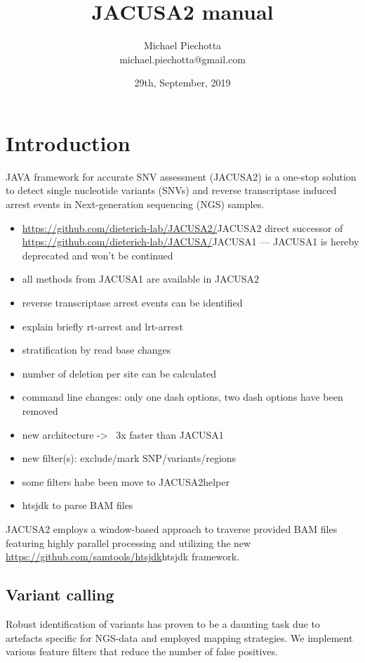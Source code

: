 \documentclass[10pt,a4paper,draft]{article}
\title{JACUSA2 manual}
\author{Michael Piechotta \\ michael.piechotta@gmail.com}
\date{29th, September, 2019}
\begin{document}
\maketitle 
\tableofcontents
\listoftodos
\section{Introduction}
JAVA framework for accurate SNV assessment (JACUSA2) is a one-stop solution to detect single
nucleotide variants (SNVs) and reverse transcriptase induced arrest events in Next-generation 
sequencing (NGS) samples. 
\begin{itemize}
  \item \url{https://github.com/dieterich-lab/JACUSA2/}{JACUSA2} direct successor of 
  \url{https://github.com/dieterich-lab/JACUSA/}{JACUSA1} --- JACUSA1 is hereby deprecated and won't be continued
  \item all methods from JACUSA1 are available in JACUSA2
  \item reverse transcriptase arrest events can be identified
  \item explain briefly rt-arrest and lrt-arrest
  \item stratification by read base changes
  \item number of deletion per site can be calculated 
  \item command line changes: only one dash options, two dash options have been removed
  \item new architecture -> ~3x faster than JACUSA1
  \item new filter(s): exclude/mark SNP/variants/regions
  \item some filters habe been move to JACUSA2helper
  \item htsjdk to parse BAM files
\end{itemize}

JACUSA2 employs a window-based approach to traverse provided BAM files featuring highly parallel 
processing and utilizing the new \url{https://github.com/samtools/htsjdk}{htsjdk} framework.

\subsection{Variant calling}
Robust identification of variants has proven to be a daunting task due to artefacts specific 
for NGS-data and employed mapping strategies. 
We implement various feature filters that reduce the number of false positives. 
\end{document}
